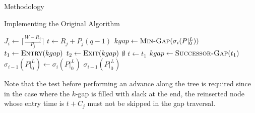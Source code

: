 \documentclass{article}
\begin{document}
\begin{section}{Methodology}
\begin{subsection}{Implementing the Original Algorithm}
\begin{paragraph}{}
    \begin{algorithm}[H]
      \caption{Gap-Tranformation Algorithm\autocite[12]{BelwalCheng}}\label{gapxfrm1}
      \begin{algorithmic}[2]
          \State $J_{i} \gets \lceil\frac{W - R_{j}}{P_{j}}\rceil$
            \State $t \gets R_{j} + P_{j}(q-1)$
            \State $kgap \gets \Call{Min-Gap}{\sigma_{i}(P|_{0}^{L})}$
            \State $t_{1} \gets \Call{Entry}{kgap}$
            \State $t_{2} \gets \Call{Exit}{kgap}$
                \State \Return $\emptyset$
              \EndIf
                \State $t \gets t_{1}$
              \EndIf
                \State \Call{Gap-Delete}{$\sigma_{i}(P|_{0}^{L}), [t_{1},t_{2})$}
                  \State \Call{Gap-Insert}{$\sigma_{i}(P|_{0}^{L}), [t_{1},t)$}
                  \ExitWhile
                \EndIf
                  \State \Call{Gap-Insert}{$\sigma_{i}(P|_{0}^{L}), [t_{1},t)$}
                  \State \Call{Gap-Insert}{$\sigma_{i}(P|_{0}^{L}), [t + C_{j},t_{2})$}
                  \ExitWhile
                \EndIf
                  \State \Call{Gap-Insert}{$\sigma_{i}(P|_{0}^{L}), [t_{1},t)$}
                \EndIf
              \EndIf
                \State $kgap \gets \Call{Successor-Gap}{t_{1}}$
              \EndIf
            \EndWhile
          \EndFor
          \State $\sigma_{i-1}(P|_{0}^{L}) \gets \sigma_{i}(P|_{0}^{L})$
          \State \Return $\sigma_{i-1}(P|_{0}^{L})$
        \EndFunction
      \end{algorithmic}
    \end{algorithm}
    \end{paragraph}
    \begin{paragraph}{}
      Note that the test before performing an advance along the tree is required
      since in the case where the $k$-gap is filled with slack at the end, the
      reinserted node whose entry time is $t + C_{j}$ must not be skipped in the
      gap traversal.
    \end{paragraph}
  \end{subsection}


\end{section}
\end{document}
